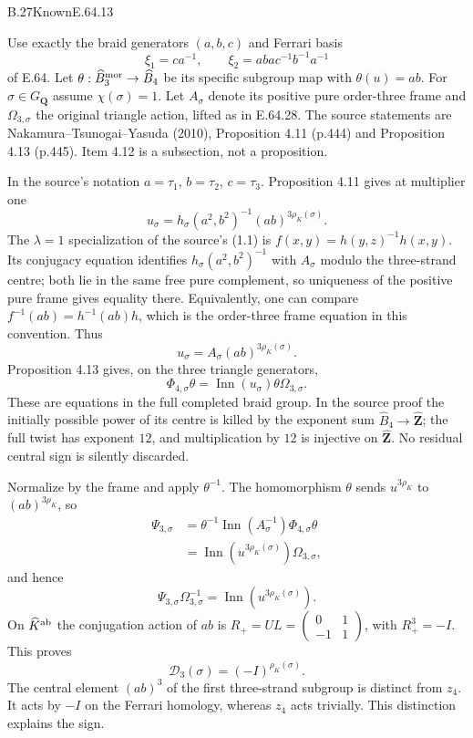 \begin{statement}{B.27}{Known}{E.64.13}
\citep[Propositions 4.11 and 4.13]{LitNakamuraTsunogaiYasuda2010}
\end{statement}
Use exactly the braid generators $(a,b,c)$ and Ferrari basis
\[
 \xi_1=ca^{-1},\qquad
 \xi_2=aba c^{-1}b^{-1}a^{-1}
\]
of E.64. Let $\theta:\widehat B_3^{\rm mor}\to\widehat B_4$
be its specific subgroup map with $\theta(u)=ab$. For
$\sigma\in G_{\mathbf Q}$ assume $\chi(\sigma)=1$.
Let $A_\sigma$ denote its positive pure order-three frame and
$\Omega_{3,\sigma}$ the original triangle action, lifted as in
E.64.28. The source statements are Nakamura--Tsunogai--Yasuda
(2010), Proposition 4.11 (p.444) and Proposition 4.13 (p.445).
Item 4.12 is a subsection, not a proposition.

In the source's notation $a=\tau_1$, $b=\tau_2$, $c=\tau_3$.
Proposition 4.11 gives at multiplier one
\[
 u_\sigma=h_\sigma(a^2,b^2)^{-1}(ab)^{3\rho_K(\sigma)}.
\]
The $\lambda=1$ specialization of the source's (1.1) is
$f(x,y)=h(y,z)^{-1}h(x,y)$. Its conjugacy equation identifies
$h_\sigma(a^2,b^2)^{-1}$ with $A_\sigma$ modulo the three-strand
centre; both lie in the same free pure complement, so uniqueness
of the positive pure frame gives equality there. Equivalently,
one can compare $f^{-1}(ab)=h^{-1}(ab)h$, which is the order-three
frame equation in this convention. Thus
\[
 u_\sigma=A_\sigma(ab)^{3\rho_K(\sigma)}.
\]
Proposition 4.13 gives, on the three triangle generators,
\[
 \Phi_{4,\sigma}\theta
       =\operatorname{Inn}(u_\sigma)\theta\Omega_{3,\sigma}.
\]
These are equations in the full completed braid group. In the
source proof the initially possible power of its centre is killed
by the exponent sum $\widehat B_4\to\widehat{\mathbf Z}$; the
full twist has exponent $12$, and multiplication by $12$ is
injective on $\widehat{\mathbf Z}$. No residual central sign
is silently discarded.

Normalize by the frame and apply $\theta^{-1}$. The homomorphism
$\theta$ sends $u^{3\rho_K}$ to $(ab)^{3\rho_K}$, so
\[
 \begin{split}
 \Psi_{3,\sigma}
 &=\theta^{-1}\operatorname{Inn}(A_\sigma^{-1})
                      \Phi_{4,\sigma}\theta\\
 &=\operatorname{Inn}(u^{3\rho_K(\sigma)})\Omega_{3,\sigma},
 \end{split}
\]
and hence
\[
 \Psi_{3,\sigma}\Omega_{3,\sigma}^{-1}
     =\operatorname{Inn}(u^{3\rho_K(\sigma)}).
\]
On $\widehat K^{\rm ab}$ the conjugation action of $ab$ is
$R_+=UL=\left(\begin{smallmatrix}0&1\\-1&1\end{smallmatrix}\right)$,
with $R_+^3=-I$. This proves
\[
 \mathcal D_3(\sigma)=(-I)^{\rho_K(\sigma)}.
\]
The central element $(ab)^3$ of the first three-strand subgroup
is distinct from $z_4$. It acts by $-I$ on the Ferrari homology,
whereas $z_4$ acts trivially. This distinction explains the sign.

